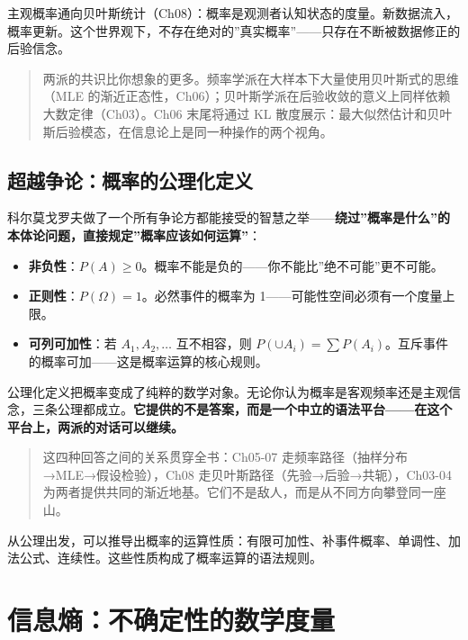 \documentclass[
]{book}
\providecommand{\tightlist}{%
  \setlength{\itemsep}{0pt}\setlength{\parskip}{0pt}}
\begin{document}
主观概率通向贝叶斯统计（Ch08）：概率是观测者认知状态的度量。新数据流入，概率更新。这个世界观下，不存在绝对的''真实概率''------只存在不断被数据修正的后验信念。

\begin{quote}
两派的共识比你想象的更多。频率学派在大样本下大量使用贝叶斯式的思维（MLE 的渐近正态性，Ch06）；贝叶斯学派在后验收敛的意义上同样依赖大数定律（Ch03）。Ch06 末尾将通过 KL 散度展示：最大似然估计和贝叶斯后验模态，在信息论上是同一种操作的两个视角。
\end{quote}

\subsection{超越争论：概率的公理化定义}\label{ux8d85ux8d8aux4e89ux8bbaux6982ux7387ux7684ux516cux7406ux5316ux5b9aux4e49}

科尔莫戈罗夫做了一个所有争论方都能接受的智慧之举------\textbf{绕过''概率是什么''的本体论问题，直接规定''概率应该如何运算''}：

\begin{itemize}
\tightlist
\item
  \textbf{非负性}：\(P(A) \geq 0\)。概率不能是负的------你不能比''绝不可能''更不可能。
\item
  \textbf{正则性}：\(P(\Omega) = 1\)。必然事件的概率为 1------可能性空间必须有一个度量上限。
\item
  \textbf{可列可加性}：若 \(A_1, A_2, \ldots\) 互不相容，则 \(P(\cup A_i) = \sum P(A_i)\)。互斥事件的概率可加------这是概率运算的核心规则。
\end{itemize}

公理化定义把概率变成了纯粹的数学对象。无论你认为概率是客观频率还是主观信念，三条公理都成立。\textbf{它提供的不是答案，而是一个中立的语法平台------在这个平台上，两派的对话可以继续。}

\begin{quote}
这四种回答之间的关系贯穿全书：Ch05-07 走频率路径（抽样分布→MLE→假设检验），Ch08 走贝叶斯路径（先验→后验→共轭），Ch03-04 为两者提供共同的渐近地基。它们不是敌人，而是从不同方向攀登同一座山。
\end{quote}

从公理出发，可以推导出概率的运算性质：有限可加性、补事件概率、单调性、加法公式、连续性。这些性质构成了概率运算的语法规则。

\section{信息熵：不确定性的数学度量}\label{ux4fe1ux606fux71b5ux4e0dux786eux5b9aux6027ux7684ux6570ux5b66ux5ea6ux91cf}
\end{document}
